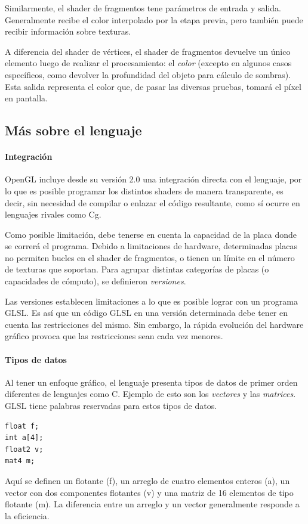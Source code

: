 Similarmente, el shader de fragmentos tene par\'ametros de entrada y salida.
Generalmente recibe el color interpolado por la etapa previa, pero tambi\'en puede recibir informaci\'on sobre texturas. 

A diferencia del shader de vértices, el shader de fragmentos devuelve un único elemento luego de realizar el procesamiento: el {\em color} (excepto en algunos casos específicos, como devolver la profundidad del objeto para cálculo de sombras).
Esta salida representa el color que, de pasar las diversas pruebas, tomar\'a el p\'ixel en pantalla.

\subsection{M\'as sobre el lenguaje}
\paragraph{Integración}
OpenGL incluye desde su versión 2.0 una integración directa con el lenguaje, por lo que es posible programar los distintos shaders de manera transparente, es decir, sin necesidad de compilar o enlazar el código resultante, como sí ocurre en lenguajes rivales como Cg.

Como posible limitación, debe tenerse en cuenta la capacidad de la placa donde se correrá el programa.
Debido a limitaciones de hardware, determinadas placas no permiten bucles en el shader de fragmentos, o tienen un límite en el número de texturas que soportan.
Para agrupar distintas categorías de placas (o capacidades de cómputo), se definieron {\em versiones}.

Las versiones establecen limitaciones a lo que es posible lograr con un programa GLSL.
Es as\'i que un código GLSL en una versión determinada debe tener en cuenta las restricciones del mismo.
Sin embargo, la r\'apida evoluci\'on del hardware gr\'afico provoca que las restricciones sean cada vez menores.

\paragraph{Tipos de datos}
Al tener un enfoque gr\'afico, el lenguaje presenta tipos de datos de primer orden diferentes de lenguajes como C. Ejemplo de esto son los {\em vectores} y las {\em matrices}.
GLSL tiene palabras reservadas para estos tipos de datos.
\begin{verbatim}
float f;
int a[4];
float2 v;
mat4 m;
\end{verbatim}
Aqu\'i se definen un flotante (f), un arreglo de cuatro elementos enteros (a), un vector con dos componentes flotantes (v) y una matriz de 16 elementos de tipo flotante (m).
La diferencia entre un arreglo y un vector generalmente responde a la eficiencia.


